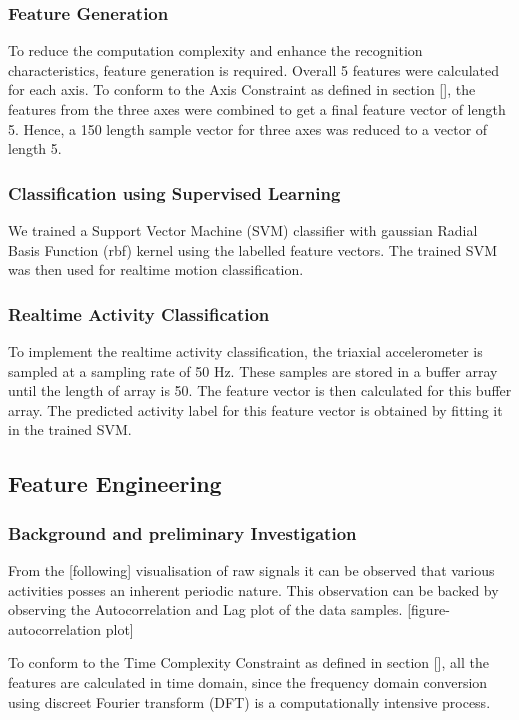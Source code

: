 \documentclass[
10pt, %
a4paper, %
oneside, %
headinclude,footinclude, %
BCOR5mm, %
]{scrartcl}
\begin{document}
\subsubsection{Feature Generation}
To reduce the computation complexity and enhance the recognition characteristics, feature generation is required. Overall 5 features were calculated for each axis. To conform to the Axis Constraint as defined in section [], the features from the three axes were combined to get a final feature vector of length 5. Hence, a 150 length sample vector for three axes was reduced to a vector of length 5.

\subsubsection{Classification using Supervised Learning}
We trained a Support Vector Machine (SVM) classifier with gaussian Radial Basis Function (rbf) kernel using the labelled feature vectors. The trained SVM was then used for realtime motion classification.

\subsubsection{Realtime Activity Classification}
To implement the realtime activity classification, the triaxial accelerometer is sampled at a sampling rate of 50 Hz. These samples are stored in a buffer array until the length of array is 50. The feature vector is then calculated for this buffer array. The predicted activity label for this feature vector is obtained by fitting it in the trained SVM.

\subsection{Feature Engineering}
\subsubsection{Background and preliminary Investigation}
From the [following] visualisation of raw signals it can be observed that various activities posses an inherent periodic nature. This observation can be backed by observing the Autocorrelation and Lag plot of the data samples. [figure- autocorrelation plot]

To conform to the Time Complexity Constraint as defined in section [], all the features are calculated in time domain, since the frequency domain conversion using discreet Fourier transform (DFT) is a computationally intensive process.
\end{document}
